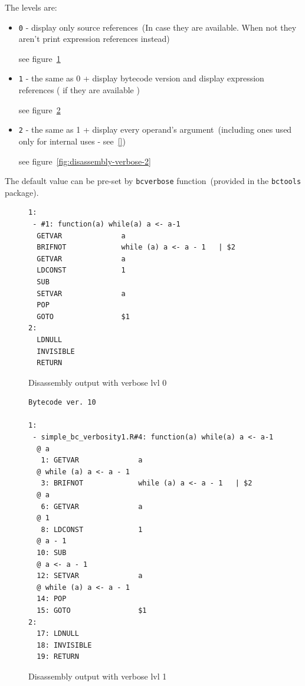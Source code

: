 \documentclass[thesis=M,english]{FITthesis}[2018/10/20]
\newcommand{\code}[1]{\texttt{#1}}
\begin{document}
The levels are:

\begin{itemize}
	\item \code{0} - display only source references~(In case they are available. When not they aren't print expression references instead)

	see figure~\ref{fig:disassembly-verbose-0}

	\item \code{1} - the same as 0 + display bytecode version and display expression references ( if they are available )

	see figure~\ref{fig:disassembly-verbose-1}

	\item \code{2} - the same as 1 + display every operand's argument~(including ones used only for internal uses - see~\ref{})

	see figure~\ref{fig:disassembly-verbose-2}

\end{itemize}

The default value can be pre-set by \code{bcverbose} function~(provided in the \code{bctools} package).

\begin{figure}[H]
\begin{lstlisting}
1:
 - #1: function(a) while(a) a <- a-1
  GETVAR              a
  BRIFNOT             while (a) a <- a - 1	 | $2
  GETVAR              a
  LDCONST             1
  SUB
  SETVAR              a
  POP
  GOTO                $1
2:
  LDNULL
  INVISIBLE
  RETURN
\end{lstlisting}
	\caption{Disassembly output with verbose lvl 0}\label{fig:disassembly-verbose-0}
\end{figure}

\begin{figure}[H]
\begin{lstlisting}
Bytecode ver. 10

1:
 - simple_bc_verbosity1.R#4: function(a) while(a) a <- a-1
  @ a
   1: GETVAR              a
  @ while (a) a <- a - 1
   3: BRIFNOT             while (a) a <- a - 1	 | $2
  @ a
   6: GETVAR              a
  @ 1
   8: LDCONST             1
  @ a - 1
  10: SUB
  @ a <- a - 1
  12: SETVAR              a
  @ while (a) a <- a - 1
  14: POP
  15: GOTO                $1
2:
  17: LDNULL
  18: INVISIBLE
  19: RETURN
\end{lstlisting}
	\caption{Disassembly output with verbose lvl 1}\label{fig:disassembly-verbose-1}
\end{figure}
\end{document}
